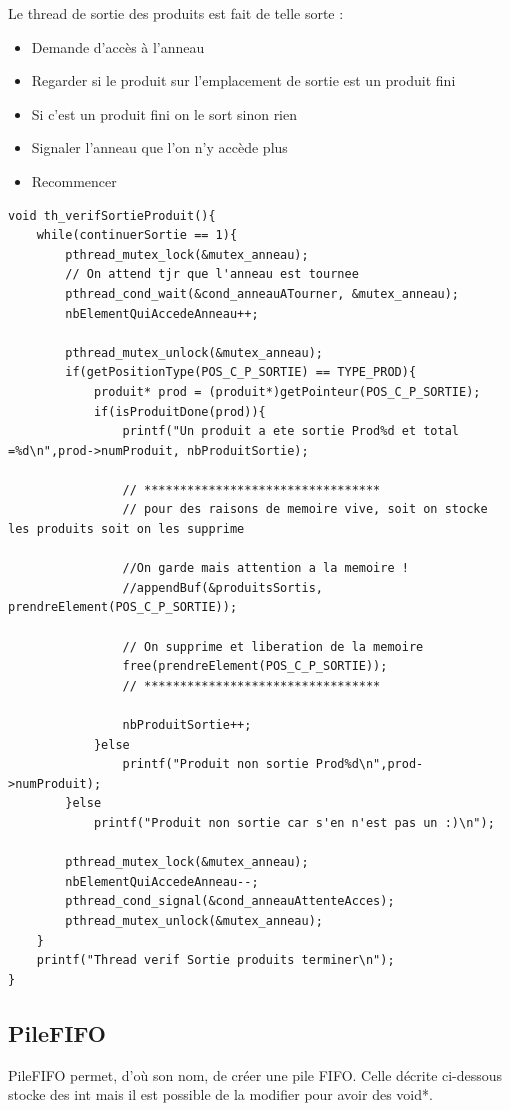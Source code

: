 \documentclass{report}
\begin{document}
Le thread de sortie des produits est fait de telle sorte :
\begin{itemize}
\item Demande d'accès à l'anneau
\item Regarder si le produit sur l'emplacement de sortie est un produit fini
\item Si c'est un produit fini on le sort sinon rien
\item Signaler l'anneau que l'on n'y accède plus
\item Recommencer
\end{itemize}
\begin{lstlisting}[caption=Fonction thread SortieProduit]
void th_verifSortieProduit(){
    while(continuerSortie == 1){
        pthread_mutex_lock(&mutex_anneau);
        // On attend tjr que l'anneau est tournee
        pthread_cond_wait(&cond_anneauATourner, &mutex_anneau);
        nbElementQuiAccedeAnneau++;
        
        pthread_mutex_unlock(&mutex_anneau);
        if(getPositionType(POS_C_P_SORTIE) == TYPE_PROD){
            produit* prod = (produit*)getPointeur(POS_C_P_SORTIE);
            if(isProduitDone(prod)){
                printf("Un produit a ete sortie Prod%d et total =%d\n",prod->numProduit, nbProduitSortie);
                
                // *********************************
                // pour des raisons de memoire vive, soit on stocke les produits soit on les supprime
                
                //On garde mais attention a la memoire !
                //appendBuf(&produitsSortis, prendreElement(POS_C_P_SORTIE));
                
                // On supprime et liberation de la memoire
                free(prendreElement(POS_C_P_SORTIE));
                // *********************************
                
                nbProduitSortie++;
            }else
                printf("Produit non sortie Prod%d\n",prod->numProduit);
        }else
            printf("Produit non sortie car s'en n'est pas un :)\n");
        
        pthread_mutex_lock(&mutex_anneau);
        nbElementQuiAccedeAnneau--;
        pthread_cond_signal(&cond_anneauAttenteAcces);
        pthread_mutex_unlock(&mutex_anneau);
    }
    printf("Thread verif Sortie produits terminer\n");
}
\end{lstlisting}

\subsection{PileFIFO}
PileFIFO permet, d'où son nom, de créer une pile FIFO. Celle décrite ci-dessous stocke des int mais il est possible de la modifier pour avoir des void*.\\
\end{document}
